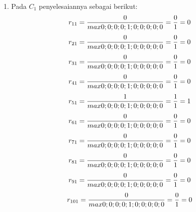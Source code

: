 \begin{enumerate}
	\item Pada $C_{1}$ penyelesaiannya sebagai berikut:
\begin{displaymath}
r_{11} = \frac{0}{max {0;0;0;0;1;0;0;0;0;0}} = \frac{0}{1} = 0\\
\end {displaymath}
\begin{displaymath}
r_{21} = \frac{0}{max {0;0;0;0;1;0;0;0;0;0}} = \frac{0}{1} = 0\\
\end{displaymath}
\begin{displaymath}
r_{31} = \frac{0}{max {0;0;0;0;1;0;0;0;0;0}} = \frac{0}{1} = 0\\
\end {displaymath}
\begin{displaymath}
r_{41} = \frac{0}{max {0;0;0;0;1;0;0;0;0;0}} = \frac{0}{1} = 0\\
\end {displaymath}
\begin{displaymath}
r_{51} = \frac{1}{max {0;0;0;0;1;0;0;0;0;0}} = \frac{1}{1} = 1\\
\end {displaymath}
\begin{displaymath}
r_{61} = \frac{0}{max {0;0;0;0;1;0;0;0;0;0}} = \frac{0}{1} = 0\\
\end {displaymath}
\begin{displaymath}
r_{71} = \frac{0}{max {0;0;0;0;1;0;0;0;0;0}} = \frac{0}{1} = 0\\
\end {displaymath}
\begin{displaymath}
r_{81} = \frac{0}{max {0;0;0;0;1;0;0;0;0;0}} = \frac{0}{1} = 0\\
\end {displaymath}
\begin{displaymath}
r_{91} = \frac{0}{max {0;0;0;0;1;0;0;0;0;0}} = \frac{0}{1} = 0\\
\end {displaymath}
\begin{displaymath}
r_{101} = \frac{0}{max {0;0;0;0;1;0;0;0;0;0}} = \frac{0}{1} = 0\\
\end {displaymath}


\end{enumerate}
